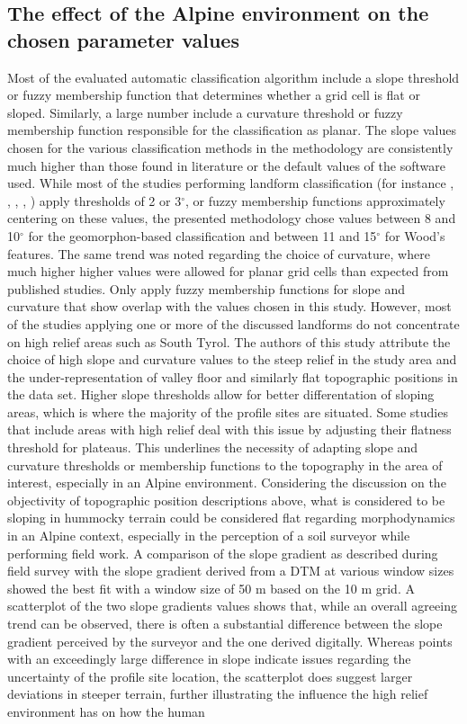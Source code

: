 \documentclass[preprint,12pt,authoryear]{elsarticle}
\begin{document}
\subsection{The effect of the Alpine environment on the chosen parameter values} 
Most of the evaluated automatic classification algorithm include a slope threshold or fuzzy membership function that determines whether a grid cell is flat or sloped. Similarly, a large number include a curvature threshold or fuzzy membership function responsible for the classification as planar. The slope values chosen for the various classification methods in the methodology are consistently much higher than those found in literature or the default values of the software used. While most of the studies performing landform classification (for instance \cite{Barka2011}, \cite{Bocco2001}, \cite{Ehsani2008}, \cite{Jasiewicz2013}, \cite{MacMillan2000a}) apply thresholds of 2 or 3$^{\circ}$, or fuzzy membership functions approximately centering on these values, the presented methodology chose values between 8 and 10$^{\circ}$ for the geomorphon-based classification and between 11 and 15$^{\circ}$ for Wood's features. The same trend was noted regarding the choice of curvature, where much higher higher values were allowed for planar grid cells than expected from published studies. Only \cite{Schmidt2004} apply fuzzy membership functions for slope and curvature that show overlap with the values chosen in this study. However, most of the studies applying one or more of the discussed landforms do not concentrate on high relief areas such as South Tyrol. The authors of this study attribute the choice of high slope and curvature values to the steep relief in the study area and the under-representation of valley floor and similarly flat topographic positions in the data set. Higher slope  thresholds allow for better differentation of sloping areas, which is where the majority of the profile sites are situated. Some studies that include areas with high relief \citep{Bocco2001,Herbst2012} deal with this issue by adjusting their flatness threshold for plateaus. This underlines the necessity of adapting slope and curvature thresholds or membership functions to the topography in the area of interest, especially in an Alpine environment. Considering the discussion on the objectivity of topographic position descriptions above, what is considered to be sloping in hummocky terrain could be considered flat regarding morphodynamics in an Alpine context, especially in the perception of a soil surveyor while performing field work. A comparison of the slope gradient as described during field survey with the slope gradient derived from a DTM at various window sizes showed the best fit with a window size of 50 m based on the 10 m grid. A scatterplot of the two slope gradients values shows that, while an overall agreeing trend can be observed, there is often a substantial difference between the slope gradient perceived by the surveyor and the one derived digitally. Whereas points with an exceedingly large difference in slope indicate issues regarding the uncertainty of the profile site location, the scatterplot does suggest larger deviations in steeper terrain, further illustrating the influence the high relief environment has on how the human 
\end{document}
